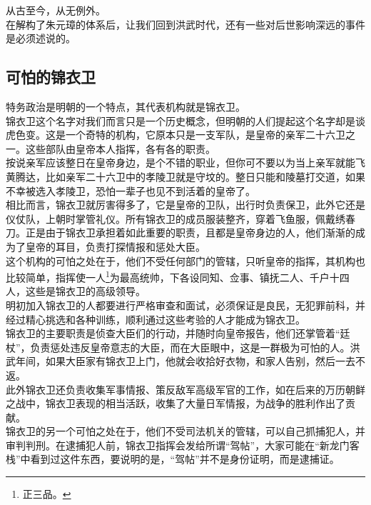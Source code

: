 \begin{multicols}{\theparacolNo}
从古至今，从无例外。\\

在解构了朱元璋的体系后，让我们回到洪武时代，还有一些对后世影响深远的事件是必须述说的。\\

\subsection{可怕的锦衣卫}
特务政治是明朝的一个特点，其代表机构就是锦衣卫。\\

锦衣卫这个名字对我们而言只是一个历史概念，但明朝的人们提起这个名字却是谈虎色变。这是一个奇特的机构，它原本只是一支军队，是皇帝的亲军二十六卫之一。这些部队由皇帝本人指挥，各有各的职责。\\

按说亲军应该整日在皇帝身边，是个不错的职业，但你可不要以为当上亲军就能飞黄腾达，比如亲军二十六卫中的孝陵卫就是守坟的。整日只能和陵墓打交道，如果不幸被选入孝陵卫，恐怕一辈子也见不到活着的皇帝了。\\

相比而言，锦衣卫就厉害得多了，它是皇帝的卫队，出行时负责保卫，此外它还是仪仗队，上朝时掌管礼仪。所有锦衣卫的成员服装整齐，穿着飞鱼服，佩戴绣春刀。正是由于锦衣卫承担着如此重要的职责，且都是皇帝身边的人，他们渐渐的成为了皇帝的耳目，负责打探情报和惩处大臣。\\

这个机构的可怕之处在于，他们不受任何部门的管辖，只听皇帝的指挥，其机构也比较简单，指挥使一人\footnote{正三品。}为最高统帅，下各设同知、佥事、镇抚二人、千户十四人，这些是锦衣卫的高级领导。\\

明初加入锦衣卫的人都要进行严格审查和面试，必须保证是良民，无犯罪前科，并经过精心挑选和各种训练，顺利通过这些考验的人才能成为锦衣卫。\\

锦衣卫的主要职责是侦查大臣们的行动，并随时向皇帝报告，他们还掌管着“廷杖”，负责惩处违反皇帝意志的大臣，而在大臣眼中，这是一群极为可怕的人。洪武年间，如果大臣家有锦衣卫上门，他就会收拾好衣物，和家人告别，然后一去不返。\\

此外锦衣卫还负责收集军事情报、策反敌军高级军官的工作，如在后来的万历朝鲜之战中，锦衣卫表现的相当活跃，收集了大量日军情报，为战争的胜利作出了贡献。\\

锦衣卫的另一个可怕之处在于，他们不受司法机关的管辖，可以自己抓捕犯人，并审判判刑。在逮捕犯人前，锦衣卫指挥会发给所谓“驾帖”，大家可能在“新龙门客栈”中看到过这件东西，要说明的是，“驾帖”并不是身份证明，而是逮捕证。\\


\end{multicols}
